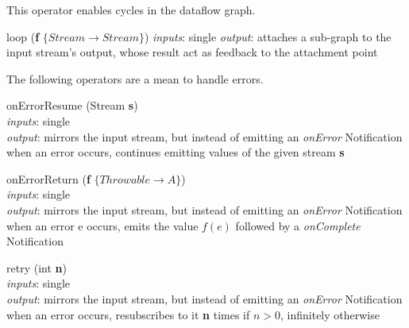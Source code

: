 \documentclass{dithesis}
\begin{document}
This operator enables cycles in the dataflow graph.
\begin{description}

\begin{minipage}[c]{0.4\linewidth}
\item[loop] (\textbf{f} $\{ Stream \to Stream \}$)
	\textit{inputs}: single
	\textit{output}: attaches a sub-graph to the input stream's output, whose result act as feedback to the attachment point
\end{minipage}
\begin{minipage}[c]{0.6\linewidth}

\end{minipage}

\end{description}

The following operators are a mean to handle errors.
\begin{description}

\begin{minipage}[c]{0.4\linewidth}
\item[onErrorResume] (Stream \textbf{s})\\
	\textit{inputs}: single \\
	\textit{output}: mirrors the input stream, but instead of emitting an \textit{onError} Notification when an error occurs, continues emitting values of the given stream \textbf{s}
\end{minipage}
\begin{minipage}[c]{0.6\linewidth}

\end{minipage}

\begin{minipage}[c]{0.4\linewidth}
\item[onErrorReturn] (\textbf{f} $\{ Throwable \to A \}$)\\
	\textit{inputs}: single \\
	\textit{output}: mirrors the input stream, but instead of emitting an \textit{onError} Notification when an error e occurs, emits the value $f(e)$ followed by a \textit{onComplete} Notification
\end{minipage}
\begin{minipage}[c]{0.6\linewidth}

\end{minipage}

\begin{minipage}[c]{0.4\linewidth}
\item[retry] (int \textbf{n})\\
	\textit{inputs}: single \\
	\textit{output}: mirrors the input stream, but instead of emitting an \textit{onError} Notification when an error occurs, resubscribes to it \textbf{n} times if $n > 0$, infinitely otherwise
\end{minipage}
\begin{minipage}[c]{0.6\linewidth}

\end{minipage}

\end{description}
\end{document}
